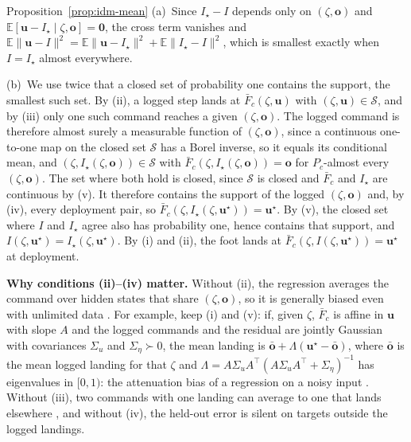 \begin{idmproof}{Proposition~\ref{prop:idm-mean}}
(a)~Since $I_\star - I$ depends only on $(\zeta,\mathbf o)$ and $\mathbb
E[\mathbf u - I_\star \mid \zeta,\mathbf o] = \mathbf 0$, the cross term
vanishes and $\mathbb E\|\mathbf u - I\|^2 = \mathbb E\|\mathbf u -
I_\star\|^2 + \mathbb E\|I_\star - I\|^2$, which is smallest exactly when
$I = I_\star$ almost everywhere.

(b)~We use twice that a closed set of probability one contains the
support, the smallest such set. By (ii), a logged step lands at $\bar
F_c(\zeta,\mathbf u)$ with $(\zeta,\mathbf u) \in \mathcal S$, and by (iii)
only one such command reaches a given $(\zeta,\mathbf o)$. The logged
command is therefore almost surely a measurable function of
$(\zeta,\mathbf o)$, since a continuous one-to-one map on the closed set
$\mathcal S$ has a Borel inverse, so it equals its conditional mean, and $(\zeta, I_\star(\zeta,\mathbf o)) \in
\mathcal S$ with $\bar F_c(\zeta, I_\star(\zeta,\mathbf o)) = \mathbf o$
for $P_c$-almost every $(\zeta,\mathbf o)$. The set where both hold is
closed, since $\mathcal S$ is closed and $\bar F_c$ and $I_\star$ are
continuous by (v). It therefore contains the support of the logged
$(\zeta,\mathbf o)$ and, by (iv), every deployment pair, so $\bar
F_c(\zeta, I_\star(\zeta,\mathbf u^\star)) = \mathbf u^\star$. By (v), the
closed set where $I$ and $I_\star$ agree also has probability one, hence
contains that support, and $I(\zeta,\mathbf u^\star) =
I_\star(\zeta,\mathbf u^\star)$. By (i) and (ii), the foot lands at
$\bar F_c(\zeta, I(\zeta,\mathbf u^\star)) = \mathbf u^\star$ at
deployment.
\end{idmproof}

\noindent\textbf{Why conditions (ii)--(iv) matter.}
 Without (ii), the regression averages the command over
hidden states that share $(\zeta,\mathbf o)$, so it is generally biased
even with unlimited data \citep{eysenbach_imitating_2022}. For example,
keep (i) and (v): if, given $\zeta$, $\bar F_c$ is affine in $\mathbf u$
with slope $A$ and the logged commands and the residual are jointly
Gaussian with covariances $\Sigma_u$ and $\Sigma_\eta \succ 0$, the mean
landing is $\bar{\mathbf o} + \Lambda(\mathbf u^\star - \bar{\mathbf o})$,
where $\bar{\mathbf o}$ is the mean logged landing for that $\zeta$ and
$\Lambda = A\Sigma_u A^\top (A\Sigma_u A^\top + \Sigma_\eta)^{-1}$ has
eigenvalues in $[0,1)$: the attenuation bias of a regression on a
noisy input \citep{fuller_measurement_1987}.
Without (iii), two commands with one landing can average to
one that lands elsewhere \citep{jordan_forward_1992}, and without (iv), the held-out error is
silent on targets outside the logged landings.

